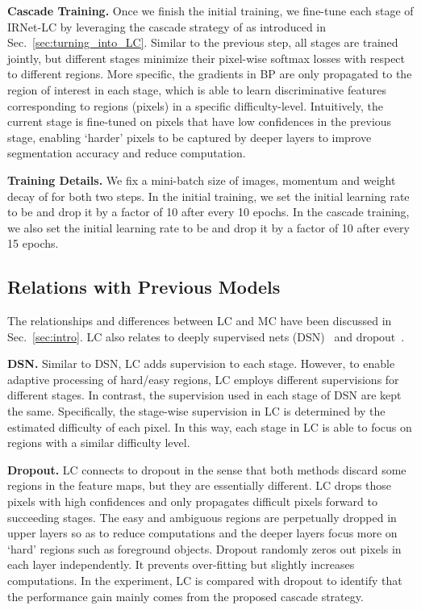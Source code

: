 \documentclass[10pt,twocolumn,letterpaper]{article}
\begin{document}
\noindent
\textbf{Cascade Training.}
Once we finish the initial training, we fine-tune each stage of IRNet-LC by leveraging the cascade strategy of  as introduced in Sec.~\ref{sec:turning_into_LC}.
Similar to the previous step, all stages are trained jointly, but different stages minimize their pixel-wise softmax losses with respect to different regions.
More specific, the gradients in BP are only propagated to the region of interest in each stage, which is able to learn discriminative features corresponding to regions (pixels) in a specific difficulty-level.
Intuitively, the current stage is fine-tuned on pixels that have low confidences in the previous stage,
enabling `harder' pixels to be captured by deeper layers to improve segmentation accuracy and reduce computation.

\noindent
\textbf{Training Details.}
We fix a mini-batch size of  images, momentum  and weight decay of  for both two steps.
In the initial training, we set the initial learning rate to be  and drop it by a factor of 10 after every 10 epochs.
In the cascade training, we also set the initial learning rate to be  and drop it by a factor of 10 after every 15 epochs.












\subsection{Relations with Previous Models}
\label{subsec:relation_models}

The relationships and differences between LC and MC have been discussed in Sec.~\ref{sec:intro}.
LC also relates to deeply supervised nets (DSN)~\cite{lee2015deeply} and dropout~\cite{srivastava2014dropout}.



\noindent
\textbf{DSN.}
Similar to DSN, LC adds supervision to each stage.
However, to enable adaptive processing of hard/easy regions, LC employs different supervisions for different stages.
In contrast, the supervision used in each stage of DSN are kept the same.
Specifically, the stage-wise supervision in LC is determined by the estimated difficulty of each pixel.
In this way, each stage in LC is able to focus on regions with a similar difficulty level.


\noindent
\textbf{Dropout.}
LC connects to dropout in the sense that both methods discard some regions in the feature maps, but they are essentially different.
LC drops those pixels with high confidences and only propagates difficult pixels forward to succeeding stages.
The easy and ambiguous regions are perpetually dropped in upper layers so as to reduce computations and the deeper layers focus more on `hard' regions such as foreground objects.
Dropout randomly zeros out pixels in each layer independently.
It prevents over-fitting but slightly increases computations.
In the experiment, LC is compared with dropout to identify that the performance gain mainly comes from the proposed cascade strategy.
\end{document}
